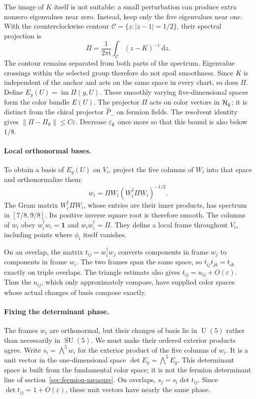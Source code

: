 \documentclass[11pt,a4paper]{article}
\theoremstyle{remark}
\DeclareMathOperator{\SU}{SU}
\DeclareMathOperator{\U}{U}
\DeclareMathOperator{\im}{im}
\newcommand{\Id}{\mathbf 1}
\newcommand{\dd}{\mathrm d}
\newcommand{\ii}{\mathrm i}
\newcommand{\eps}{\varepsilon}
\begin{document}
The image of $K$ itself is not suitable: a small perturbation can
produce extra nonzero eigenvalues near zero. Instead, keep only the
five eigenvalues near one. With the counterclockwise contour
$\mathcal C=\{z:|z-1|=1/2\}$, their spectral projection is
\begin{equation}
 \Pi=\frac1{2\pi\ii}\int_{\mathcal C}(z-K)^{-1}\,\dd z .
 \label{app:g:projection-formula}
\end{equation}
The contour remains separated from both parts of the spectrum. Eigenvalue
crossings within the selected group therefore do not spoil smoothness.
Since $K$ is independent of the anchor and acts on the same space in
every chart, so does $\Pi$. Define $E_y(U)=\im\Pi(y,U)$.
These smoothly varying five-dimensional spaces form the color bundle
$E(U)$. The projector $\Pi$ acts on color vectors in $\mathcal H_{\rm g}$;
it is distinct from the chiral projector $\widehat P_-$ on fermion fields.
The resolvent identity gives $\|\Pi-\Pi_k\|\le C\eps$.
Decrease $\eps_{\rm g}$ once more so that this bound is also below $1/8$.

\paragraph{Local orthonormal bases.}
To obtain a basis of $E_y(U)$ on $V_i$, project the five columns of
$W_i$ into that space and orthonormalize them:
\begin{equation}
 w_i=\Pi W_i(W_i^{\dagger}\Pi W_i)^{-1/2}.
 \label{app:g:safe-frame}
\end{equation}
The Gram matrix $W_i^\dagger\Pi W_i$, whose entries are their inner
products, has spectrum in $[7/8,9/8]$. Its positive inverse square
root is therefore smooth. The columns of $w_i$ obey
$w_i^\dagger w_i=\Id$ and $w_iw_i^\dagger=\Pi$. They define a local
frame throughout $V_i$, including points where $\phi_i$ itself vanishes.

On an overlap, the matrix $t_{ij}=w_i^\dagger w_j$ converts components
in frame $w_j$ to components in frame $w_i$. The two frames span the
same space, so $t_{ij}t_{jk}=t_{ik}$ exactly on triple overlaps.
The triangle estimate also gives $t_{ij}=u_{ij}+O(\eps)$.
Thus the $u_{ij}$, which only approximately compose, have supplied
color spaces whose actual changes of basis compose exactly.

\paragraph{Fixing the determinant phase.}
The frames $w_i$ are orthonormal, but their changes of basis lie in
$\U(5)$ rather than necessarily in $\SU(5)$. We must make their
ordered exterior products agree. Write $s_i=\bigwedge^5w_i$ for the
exterior product of the five columns of $w_i$. It is a unit vector
in the one-dimensional space $\det E_y=\bigwedge^5E_y$.
This determinant space is built from the fundamental color space;
it is not the fermion determinant line of section~\ref{sec:fermion-measure}.
On overlaps, $s_j=s_i\det t_{ij}$. Since
$\det t_{ij}=1+O(\eps)$, these unit vectors have nearly the same phase.
\end{document}
